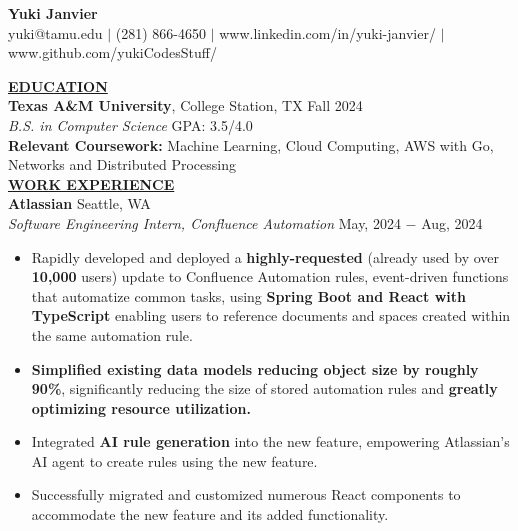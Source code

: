 \documentclass{article}
\begin{document}
\begin{center}
\thispagestyle{empty}
\large \textbf{Yuki Janvier \\}
\normalsize yuki@tamu.edu $\mid$ (281) 866-4650 $\mid$ www.linkedin.com/in/yuki-janvier/ $\mid$ www.github.com/yukiCodesStuff/ \\
\hrulefill
\end{center}

\noindent \textbf{\underline{EDUCATION}} \\
\textbf{Texas A\&M University}, College Station, TX \hfill Fall 2024 \\
\textit{B.S. in Computer Science} \hfill GPA: 3.5/4.0 \\ 
\textbf{Relevant Coursework:} Machine Learning, Cloud Computing, AWS with Go, Networks and Distributed Processing \\ 

% 
%
\noindent \textbf{\underline{WORK EXPERIENCE}} \\
\noindent \textbf{Atlassian} \hfill Seattle, WA \\
\textit{Software Engineering Intern, Confluence Automation} \hfill May, 2024 $-$ Aug, 2024
\begin{itemize}[noitemsep,nolistsep,leftmargin=*]
\item {Rapidly developed and deployed a \textbf{highly-requested} (already used by over \textbf{10,000} users) update to Confluence Automation rules, event-driven functions that automatize common tasks, using \textbf{Spring Boot and React with TypeScript} enabling users to reference documents and spaces created within the same automation rule. }
\item {\textbf{Simplified existing data models reducing object size by roughly 90\%}, significantly reducing the size of stored automation rules and \textbf{greatly optimizing resource utilization.} }
\item {Integrated \textbf{AI rule generation} into the new feature, empowering Atlassian's AI agent to create rules using the new feature. }
\item {Successfully migrated and customized numerous React components to accommodate the new feature and its added functionality. \\}
\end{itemize}
\end{document}
